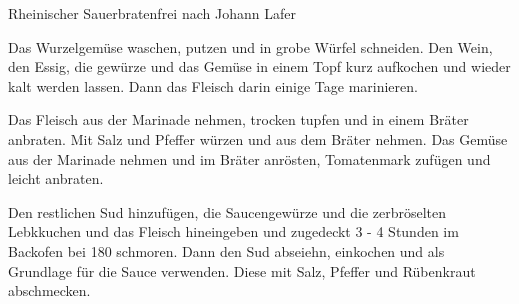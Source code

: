 \begin{recipe}{Rheinischer Sauerbraten}{frei nach Johann Lafer}
  \label{Sauerbraten}
  
  
  \steps
  Das Wurzelgemüse waschen, putzen und in grobe Würfel schneiden. Den Wein, den Essig, die
  gewürze und das Gemüse in einem Topf kurz aufkochen und wieder kalt werden lassen. Dann
  das Fleisch darin einige Tage marinieren.
  
  Das Fleisch aus der Marinade nehmen, trocken tupfen und in einem Bräter anbraten. Mit
  Salz und Pfeffer würzen und aus dem Bräter nehmen. Das Gemüse aus der  Marinade nehmen
  und im Bräter anrösten, Tomatenmark zufügen und leicht anbraten. 
  
  Den restlichen Sud hinzufügen, die Saucengewürze und die zerbröselten Lebkkuchen und das
  Fleisch hineingeben und zugedeckt 3 - 4 Stunden im Backofen bei 180 \celsius schmoren.
  Dann den Sud abseiehn, einkochen und als Grundlage für die Sauce verwenden. Diese mit
  Salz, Pfeffer und Rübenkraut abschmecken.
\end{recipe}
